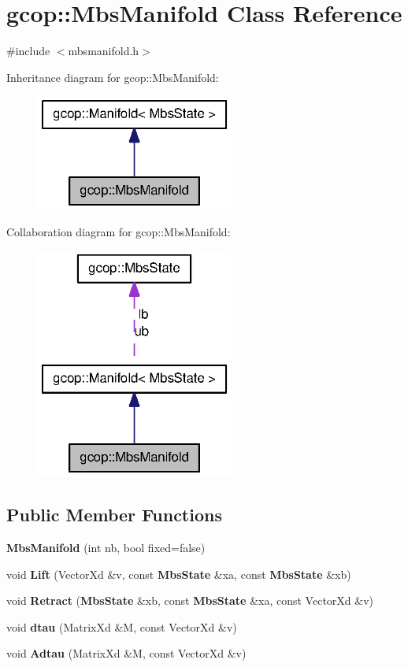 \section{gcop\-:\-:\-Mbs\-Manifold \-Class \-Reference}
\label{classgcop_1_1MbsManifold}


{\ttfamily \#include $<$mbsmanifold.\-h$>$}



\-Inheritance diagram for gcop\-:\-:\-Mbs\-Manifold\-:\nopagebreak
\begin{figure}[H]
\begin{center}
\leavevmode
\includegraphics[width=184pt]{classgcop_1_1MbsManifold__inherit__graph}
\end{center}
\end{figure}


\-Collaboration diagram for gcop\-:\-:\-Mbs\-Manifold\-:\nopagebreak
\begin{figure}[H]
\begin{center}
\leavevmode
\includegraphics[width=184pt]{classgcop_1_1MbsManifold__coll__graph}
\end{center}
\end{figure}
\subsection*{\-Public \-Member \-Functions}
\begin{DoxyCompactItemize}
\item 
{\bf \-Mbs\-Manifold} (int nb, bool fixed=false)
\item 
void {\bf \-Lift} (\-Vector\-Xd \&v, const {\bf \-Mbs\-State} \&xa, const {\bf \-Mbs\-State} \&xb)
\item 
void {\bf \-Retract} ({\bf \-Mbs\-State} \&xb, const {\bf \-Mbs\-State} \&xa, const \-Vector\-Xd \&v)
\item 
void {\bf dtau} (\-Matrix\-Xd \&\-M, const \-Vector\-Xd \&v)
\item 
void {\bf \-Adtau} (\-Matrix\-Xd \&\-M, const \-Vector\-Xd \&v)
\end{DoxyCompactItemize}
